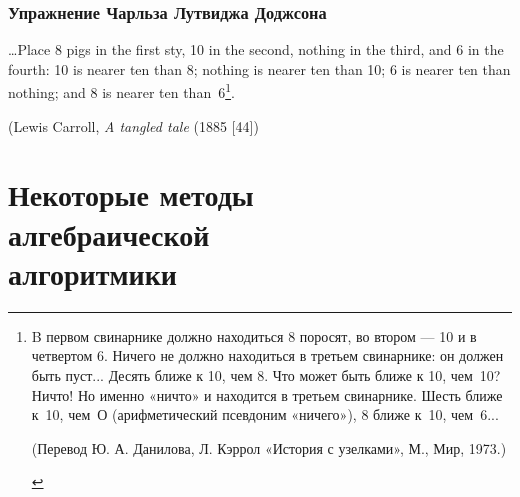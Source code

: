     \subsection{\normalsize{Упражнение Чарльза Лутвиджа Доджсона}}
    { \ldots Place 8 pigs in the first sty, 10 in the second, nothing in the third, and 6 in the fourth: 10 is nearer ten than 8; nothing is nearer ten than 10; 6 is nearer ten than nothing; and 8 is nearer ten than~6\footnote{B первом свинарнике должно находиться 8 поросят, во втором — 10 и в четвертом 6. Ничего не должно находиться в третьем свинарнике: он должен быть пуст... Десять ближе к 10, чем 8. Что может быть ближе к 10, чем~10? Ничто! Но именно «ничто» и находится в третьем свинарнике. Шесть ближе к~10, чем~О (арифметический псевдоним «ничего»), 8 ближе к~10, чем~6...
    \begin{flushright} (Перевод Ю. А. Данилова, Л. Кэррол «История с узелками», М., Мир, 1973.)\end{flushright}}.

    \begin{flushright} (Lewis Carroll, \textit {A tangled tale} (1885 [44])\end{flushright}}

    \setcounter{section}{0}

    \chapter[Некоторые методы алгебраической алгоритмики]{Некоторые методы \\ алгебраической \\ алгоритмики}
    \thispagestyle{empty}

